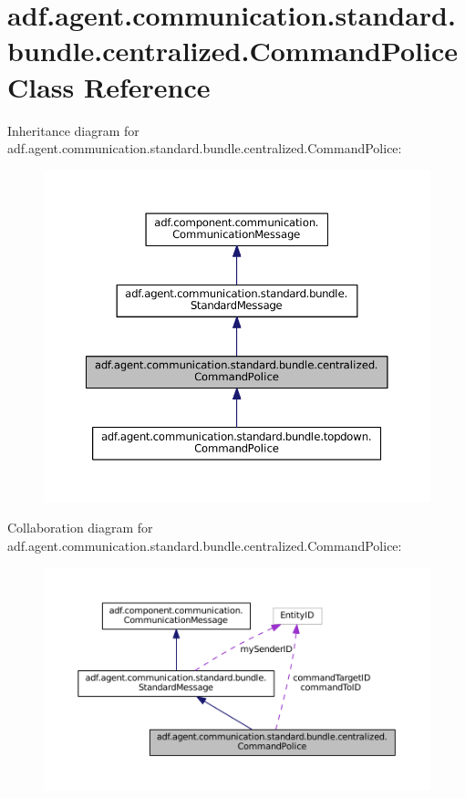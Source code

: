 \hypertarget{classadf_1_1agent_1_1communication_1_1standard_1_1bundle_1_1centralized_1_1CommandPolice}{}\section{adf.\+agent.\+communication.\+standard.\+bundle.\+centralized.\+Command\+Police Class Reference}
\label{classadf_1_1agent_1_1communication_1_1standard_1_1bundle_1_1centralized_1_1CommandPolice}


Inheritance diagram for adf.\+agent.\+communication.\+standard.\+bundle.\+centralized.\+Command\+Police\+:
\nopagebreak
\begin{figure}[H]
\begin{center}
\leavevmode
\includegraphics[width=350pt]{classadf_1_1agent_1_1communication_1_1standard_1_1bundle_1_1centralized_1_1CommandPolice__inherit__graph}
\end{center}
\end{figure}


Collaboration diagram for adf.\+agent.\+communication.\+standard.\+bundle.\+centralized.\+Command\+Police\+:
\nopagebreak
\begin{figure}[H]
\begin{center}
\leavevmode
\includegraphics[width=350pt]{classadf_1_1agent_1_1communication_1_1standard_1_1bundle_1_1centralized_1_1CommandPolice__coll__graph}
\end{center}
\end{figure}
